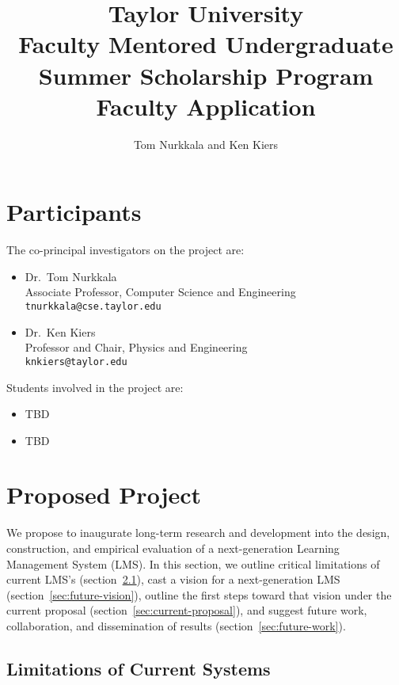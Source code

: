 \documentclass{article}
\title{Taylor University\\
  Faculty Mentored Undergraduate\\
  Summer Scholarship Program\\
  Faculty Application}
\author{Tom Nurkkala and Ken Kiers}
\begin{document}
\maketitle
\tableofcontents

\section{Participants}
\label{sec:participants}

The co-principal investigators on the project are:
\begin{itemize}
\item Dr.\ Tom Nurkkala\\
  Associate Professor, Computer Science and Engineering\\
  \texttt{tnurkkala@cse.taylor.edu}
\item Dr.\ Ken Kiers\\
  Professor and Chair, Physics and Engineering\\
  \texttt{knkiers@taylor.edu}
\end{itemize}
Students involved in the project are:
\begin{itemize}
\item TBD
\item TBD
\end{itemize}


\section{Proposed Project}
\label{sec:proposed-project}


We propose to inaugurate long-term research and development
into the design, construction, and empirical evaluation
of a next-generation Learning Management System (LMS).
In this section, we
outline critical limitations of current LMS's (section~\ref{sec:current-limitations}),
cast a vision for a next-generation LMS (section~\ref{sec:future-vision}),
outline the first steps toward that vision under the current proposal (section~\ref{sec:current-proposal}),
and suggest future work, collaboration, and dissemination of results (section~\ref{sec:future-work}).

\subsection{Limitations of Current Systems}
\label{sec:current-limitations}
\end{document}
